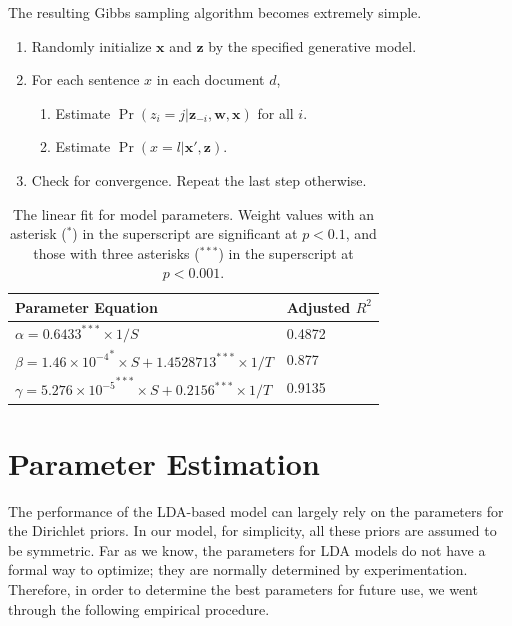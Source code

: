 The resulting Gibbs sampling algorithm becomes extremely simple.

\begin{enumerate}
  \item Randomly initialize $\mathbf{x}$ and $\mathbf{z}$ by the specified generative model.
  \item For each sentence $x$ in each document $d$, \begin{enumerate}
    \item Estimate $\Pr(z_i = j|\mathbf{z}_{-i}, \mathbf{w}, \mathbf{x})$ for all $i$.
    \item Estimate $\Pr(x = l|\mathbf{x}',\mathbf{z})$.
  \end{enumerate}
  \item Check for convergence.  Repeat the last step otherwise.
\end{enumerate}


\begin{table}[!ht]
  \centering
  \begin{tabular}{ll}
    Parameter Equation &  Adjusted $R^2$ \\
    \hline
    $\alpha = 0.6433^{***} \times 1/S$ & 0.4872 \\
    $\beta = 1.46 \times {10^{-4}}^{*} \times S + 1.4528713^{***} \times 1/T$ & 0.877 \\
    $\gamma = 5.276 \times {10^{-5}}^{***} \times S + 0.2156^{***} \times 1/T $& 0.9135 
  \end{tabular}

  \caption{The linear fit for model parameters.  Weight values with
  an asterisk ($^*$) in the superscript are significant at $p < 0.1$, and those
  with three asterisks ($^{***}$) in the superscript at $p < 0.001$.} \label{t:model-parameters}
\end{table}


\section{Parameter Estimation} \label{s:parameter-estimation}

 The performance of the LDA-based model can largely rely
on the parameters for the Dirichlet priors.  In our model, for simplicity, all
these priors are assumed to be symmetric.  Far as we know, the parameters for
LDA models do not have a formal way to optimize; they are normally determined
by experimentation.  Therefore, in order to determine the best parameters for
future use, we went through the following empirical procedure.  

